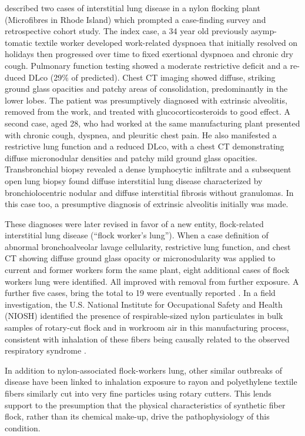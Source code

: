 \documentclass[a4
er,12pt]{article}
\begin{document}
\cite{Kern1998}  described two cases of interstitial lung disease in a nylon flocking plant (Microfibres in Rhode Island) which prompted a case-finding survey and retrospective cohort study. The index case, a 34 year old previously asymp- tomatic textile worker developed work-related dyspnoea that initially resolved on holidays then progressed over time to fixed exertional dyspnoea and chronic dry cough. Pulmonary function testing showed a moderate restrictive deficit and a re- duced DLco (29\% of predicted). Chest CT imaging showed diffuse, striking ground glass opacities and patchy areas of consolidation, predominantly in the lower lobes. The patient was presumptively diagnosed with extrinsic alveolitis, removed from the work, and treated with glucocorticosteroids to good effect. A second case, aged 28, who had worked at the same manufacturing plant presented with chronic cough, dyspnea, and pleuritic chest pain. He also manifested a restrictive lung function and a reduced DLco, with a chest CT demonstrating diffuse micronodular densities and patchy mild ground glass opacities. Transbronchial biopsy revealed a dense lymphocytic infiltrate and a subsequent open lung biopsy found diffuse interstitial lung disease characterized by bronchiolocentric nodular and diffuse interstitial fibrosis without granulomas. In this case too, a presumptive diagnosis of extrinsic alveolitis initially was made.

These diagnoses were later revised in favor of a new entity, flock-related interstitial lung disease (“flock worker’s lung”). When a case definition of abnormal bronchoalveolar lavage cellularity, restrictive lung function, and chest CT showing diffuse ground glass opacity or micronodularity was applied to current and former workers form the same plant, eight additional cases of flock workers lung were identified. All improved with removal from further exposure. A further five cases, bring the total to 19 were eventually reported \cite{Kern2000}. In a field investigation, the U.S. National Institute for Occupational Safety and Health (NIOSH) identified the presence of respirable-sized nylon particulates in bulk samples of rotary-cut flock and in workroom air in this manufacturing process, consistent with inhalation of these fibers being causally related to the observed respiratory syndrome \cite{Burkhart1999}.

In addition to nylon-associated flock-workers lung, other similar outbreaks of disease have been linked to inhalation exposure to rayon and polyethylene textile fibers similarly cut into very fine particles using rotary cutters. This lends support to the presumption that the physical characteristics of synthetic fiber flock, rather than its chemical make-up, drive the pathophysiology of this condition.
\end{document}

